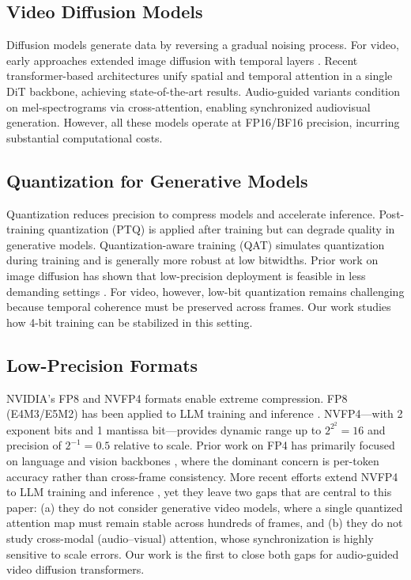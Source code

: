 \documentclass[journal,twoside]{IEEEtran}
\theoremstyle{definition}
\theoremstyle{remark}
\begin{document}
\subsection{Video Diffusion Models}
Diffusion models \cite{ho2020denoising, song2021denoising} generate data by reversing a gradual noising process. For video, early approaches extended image diffusion with temporal layers \cite{ho2022video, yang2022latent}. Recent transformer-based architectures \cite{peebles2023scalable, ma2024latte} unify spatial and temporal attention in a single DiT backbone, achieving state-of-the-art results. Audio-guided variants \cite{zhu2023tune, guo2024audio} condition on mel-spectrograms via cross-attention, enabling synchronized audiovisual generation. However, all these models operate at FP16/BF16 precision, incurring substantial computational costs.

\subsection{Quantization for Generative Models}
Quantization reduces precision to compress models and accelerate inference. Post-training quantization (PTQ) \cite{bondarenko2024understanding, xiao2023smoothquant} is applied after training but can degrade quality in generative models. Quantization-aware training (QAT) \cite{esser2020learned, liu2020lsq} simulates quantization during training and is generally more robust at low bitwidths. Prior work on image diffusion has shown that low-precision deployment is feasible in less demanding settings \cite{li2023efficientdm}. For video, however, low-bit quantization remains challenging because temporal coherence must be preserved across frames. Our work studies how 4-bit training can be stabilized in this setting.

\subsection{Low-Precision Formats}
NVIDIA's FP8 \cite{nvidia2022fp8} and NVFP4 \cite{nvidia2024nvfp4} formats enable extreme compression. FP8 (E4M3/E5M2) has been applied to LLM training \cite{dettmers2023qlora} and inference \cite{frantar2023gptq, dettmers2022llm}. NVFP4---with 2 exponent bits and 1 mantissa bit---provides dynamic range up to $2^{2^2} = 16$ and precision of $2^{-1} = 0.5$ relative to scale. Prior work on FP4 has primarily focused on language and vision backbones \cite{zhao2023fp4}, where the dominant concern is per-token accuracy rather than cross-frame consistency. More recent efforts extend NVFP4 to LLM training and inference \cite{nvidia2024nvfp4}, yet they leave two gaps that are central to this paper: (a) they do not consider generative video models, where a single quantized attention map must remain stable across hundreds of frames, and (b) they do not study cross-modal (audio--visual) attention, whose synchronization is highly sensitive to scale errors. Our work is the first to close both gaps for audio-guided video diffusion transformers.
\end{document}
